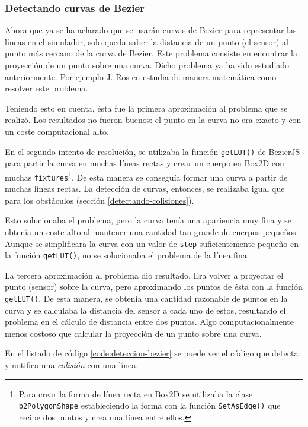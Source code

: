 \subsubsection{Detectando curvas de Bezier}

Ahora que ya se ha aclarado que se usarán curvas de Bezier para representar las líneas en el simulador, solo queda saber la distancia de un punto (el sensor) al punto más cercano de la curva de Bezier. Este problema consiste en encontrar la proyección de un punto sobre una curva. Dicho problema ya ha sido estudiado anteriormente. Por ejemplo J. Ros en \cite{projection-point-bezier} estudia de manera matemática como resolver este problema. 

Teniendo esto en cuenta, ésta fue la primera aproximación al problema que se realizó. Los resultados no fueron buenos: el punto en la curva no era exacto y con un coste computacional alto.

En el segundo intento de resolución, se utilizaba la función \texttt{getLUT()} de BezierJS para partir la curva en muchas líneas rectas y crear un cuerpo en Box2D con muchas \texttt{fixtures}\footnote{Para crear la forma de línea recta en Box2D se utilizaba la clase \texttt{b2PolygonShape} estableciendo la forma con la función \texttt{SetAsEdge()} que recibe dos puntos y crea una línea entre ellos.}. De esta manera se conseguía formar una curva a partir de muchas líneas rectas. La detección de curvas, entonces, se realizaba igual que para los obstáculos (sección \ref{detectando-colisiones}).

Esto solucionaba el problema, pero la curva tenía una apariencia muy fina y se obtenía un coste alto al mantener una cantidad tan grande de cuerpos pequeños. Aunque se simplificara la curva con un valor de \texttt{step} suficientemente pequeño en la función \texttt{getLUT()}, no se solucionaba el problema de la línea fina.

La tercera aproximación al problema dio resultado. Era volver a proyectar el punto (sensor) sobre la curva, pero aproximando los puntos de ésta con la función \texttt{getLUT()}. De esta manera, se obtenía una cantidad razonable de puntos en la curva y se calculaba la distancia del sensor a cada uno de estos, resultando el problema en el cálculo de distancia entre dos puntos. Algo computacionalmente menos costoso que calcular la proyección de un punto sobre una curva. 

En el listado de código \ref{code:deteccion-bezier} se puede ver el código que detecta y notifica una \emph{colisión} con una línea. 


